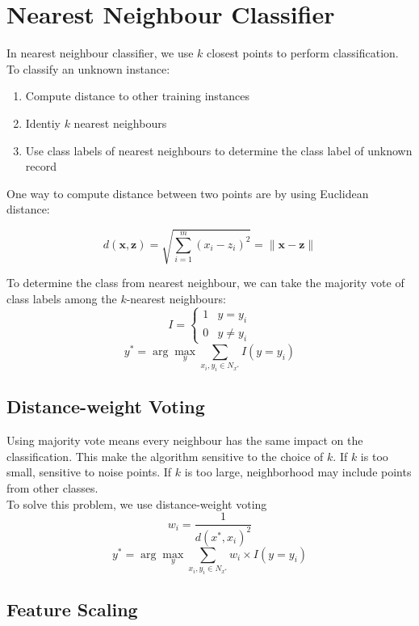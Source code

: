 \chapter{Nearest Neighbour Classifier}

\begin{multicols*}{2}

\noindent In nearest neighbour classifier, we use $k$ closest points to perform classification. To classify an unknown instance:

\begin{enumerate}
    \item Compute distance to other training instances
    \item Identiy $k$ nearest neighbours
    \item Use class labels of nearest neighbours to determine the class label of unknown record
\end{enumerate}

\noindent One way to compute distance between two points are by using Euclidean distance:

$$d(\mathbf{x},\mathbf{z}) = \sqrt{\sum_{i=1}^m (x_i - z_i)^2} = \|\mathbf{x} - \mathbf{z}\|$$

\noindent To determine the class from nearest neighbour, we can take the majority vote of class labels among the $k$-nearest neighbours:
$$
I = 
\begin{cases}
1 & y = y_i\\
0 & y \ne y_i
\end{cases}
$$
$$y^* = \arg\!\max_y \sum_{x_i,y_i \in N_{x^*}} I(y = y_i)$$

\section{Distance-weight Voting}

\noindent Using majority vote means every neighbour has the same impact on the classification. This make the algorithm sensitive to the choice of $k$. If $k$ is too small, sensitive to noise points. If $k$ is too large, neighborhood may include points from other classes. \\

\noindent To solve this problem, we use distance-weight voting
$$w_i=\frac{1}{d(x^*,x_i)^2}$$
$$y^* = \arg\!\max_y \sum_{x_i,y_i \in N_{x^*}} w_i \times I(y = y_i)$$


\section{Feature Scaling}


\end{multicols*}
